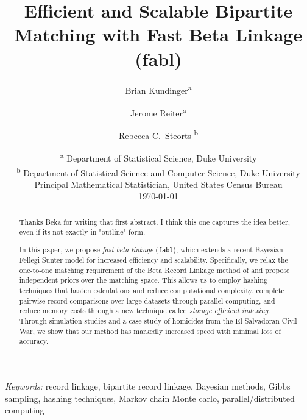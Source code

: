 \documentclass[12pt,letterpaper]{article}
\title{Efficient and Scalable Bipartite Matching with Fast Beta Linkage  (fabl)}
\author{Brian Kundinger\textsuperscript{a} \and
  Jerome Reiter\textsuperscript{a} \and 
  Rebecca C.~Steorts \textsuperscript{b}}
\date{
 \textsuperscript{a} Department of Statistical Science, Duke University \\
 \textsuperscript{b} Department of Statistical Science and Computer Science, Duke University\\Principal Mathematical Statistician, United States Census Bureau\\[2ex]
  \today}
\newcommand{\1}[1]{\mathbb{I}\!\left[#1\right]} %
\begin{document}
\maketitle

\bigskip
\begin{abstract}

{
	\color{blue} Thanks Beka for writing that first abstract. I think this one captures the idea better, even if its not exactly in "outline" form.
	\vspace{1em}
}

In this paper, we propose \emph{fast beta linkage} (\texttt{fabl}), which extends a recent Bayesian Fellegi Sunter model for increased efficiency and scalability. Specifically, we relax the one-to-one matching requirement of the Beta Record Linkage method of \citep{sadinle_bayesian_2017} and propose independent priors over the matching space. This allows us to employ hashing techniques that hasten calculations and reduce computational complexity, complete pairwise record comparisons over large datasets through parallel computing, and reduce memory costs through a new technique called \emph{storage efficient indexing}. Through simulation studies and a case study of homicides from the El Salvadoran Civil War, we show that our method has markedly increased speed with minimal loss of accuracy.

\end{abstract}


\noindent%
{\it Keywords:} record linkage, bipartite record linkage, Bayesian methods, Gibbs sampling, hashing techniques, Markov chain Monte carlo, parallel/distributed computing
\end{document}
